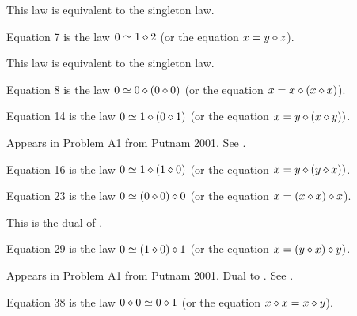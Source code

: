 This law is equivalent to the singleton law.

\begin{definition}[Equation 7]\label{eq7}\leanok{}  Equation 7 is the law $0 \simeq 1 \diamond 2$ (or the equation $x = y \diamond z$).
\end{definition}

This law is equivalent to the singleton law.

\begin{definition}[Equation 8]\label{eq8}\leanok{}  Equation 8 is the law $0 \simeq 0 \diamond (0 \diamond 0)$ (or the equation $x = x \diamond (x \diamond x)$).
\end{definition}

\begin{definition}[Equation 14]\label{eq14}\leanok{}  Equation 14 is the law $0 \simeq  1 \diamond (0 \diamond 1)$ (or the equation $x = y \diamond (x \diamond y))$.
\end{definition}

Appears in Problem A1 from Putnam 2001.  See .

\begin{definition}[Equation 16]\label{eq16}\leanok{}  Equation 16 is the law $0 \simeq  1 \diamond (1 \diamond 0)$ (or the equation $x = y \diamond (y \diamond x))$.
\end{definition}

\begin{definition}[Equation 23]\label{eq23}\leanok{}  Equation 23 is the law $0 \simeq  (0 \diamond 0) \diamond 0$ (or the equation $x = (x \diamond x) \diamond x$).
\end{definition}

This is the dual of .

\begin{definition}[Equation 29]\label{eq29}\leanok{}  Equation 29 is the law $0 \simeq  (1 \diamond 0) \diamond 1$ (or the equation $x = (y \diamond x) \diamond y)$.
\end{definition}

Appears in Problem A1 from Putnam 2001.  Dual to .  See .

\begin{definition}[Equation 38]\label{eq38}\leanok{}  Equation 38 is the law $0 \diamond 0  \simeq  0 \diamond 1$ (or the equation $x \diamond x = x \diamond y$).
\end{definition}

